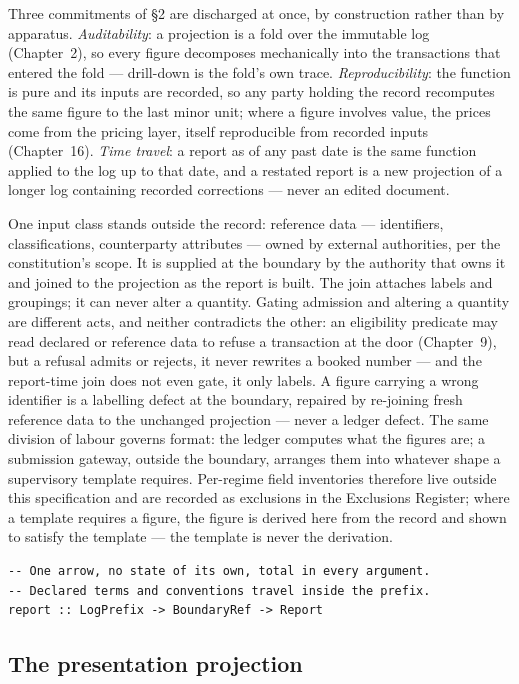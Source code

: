 \documentclass[11pt,a4paper]{article}
\begin{document}
Three commitments of \S 2 are discharged at once, by construction rather than by
apparatus. \emph{Auditability}: a projection is a fold over the immutable log
(Chapter~2), so every figure decomposes mechanically into the transactions that
entered the fold --- drill-down is the fold's own trace. \emph{Reproducibility}:
the function is pure and its inputs are recorded, so any party holding the
record recomputes the same figure to the last minor unit; where a figure
involves value, the prices come from the pricing layer, itself reproducible from
recorded inputs (Chapter~16). \emph{Time travel}: a report as of any past date
is the same function applied to the log up to that date, and a restated report
is a new projection of a longer log containing recorded corrections --- never an
edited document.

One input class stands outside the record: reference data --- identifiers,
classifications, counterparty attributes --- owned by external authorities, per
the constitution's scope. It is supplied at the boundary by the authority that
owns it and joined to the projection as the report is built. The join attaches
labels and groupings; it can never alter a quantity. Gating admission and altering a
quantity are different acts, and neither contradicts the other: an eligibility predicate
may read declared or reference data to refuse a transaction at the door (Chapter~9), but a
refusal admits or rejects, it never rewrites a booked number --- and the report-time join
does not even gate, it only labels. A figure carrying a wrong
identifier is a labelling defect at the boundary, repaired by re-joining fresh
reference data to the unchanged projection --- never a ledger defect. The same
division of labour governs format: the ledger computes what the figures are; a
submission gateway, outside the boundary, arranges them into whatever shape a
supervisory template requires. Per-regime field inventories therefore live
outside this specification and are recorded as exclusions in the Exclusions
Register; where a template requires a figure, the figure is derived here from
the record and shown to satisfy the template --- the template is never the
derivation.

\begin{lstlisting}
-- One arrow, no state of its own, total in every argument.
-- Declared terms and conventions travel inside the prefix.
report :: LogPrefix -> BoundaryRef -> Report
\end{lstlisting}

\subsection{The presentation projection}
\end{document}
